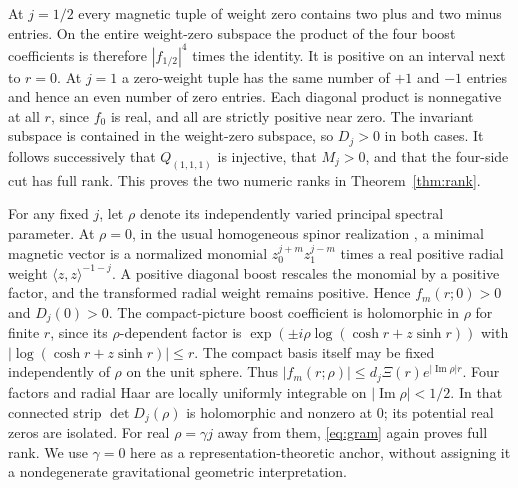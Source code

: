 \documentclass[11pt]{article}
\theoremstyle{remark}
\begin{document}
At \(j=1/2\) every magnetic tuple of weight zero contains two plus and two minus entries. On the entire weight-zero subspace the product of the four boost coefficients is therefore \(|f_{1/2}|^4\) times the identity. It is positive on an interval next to \(r=0\). At \(j=1\) a zero-weight tuple has the same number of \(+1\) and \(-1\) entries and hence an even number of zero entries. Each diagonal product is nonnegative at all \(r\), since \(f_0\) is real, and all are strictly positive near zero. The invariant subspace is contained in the weight-zero subspace, so \(D_j>0\) in both cases. It follows successively that \(Q_{(1,1,1)}\) is injective, that \(M_j>0\), and that the four-side cut has full rank. This proves the two numeric ranks in Theorem~\ref{thm:rank}.

For any fixed \(j\), let \(\rho\) denote its independently varied principal spectral parameter. At \(\rho=0\), in the usual homogeneous spinor realization \cite[Eqs.~(12)--(13)]{Barrett}, a minimal magnetic vector is a normalized monomial \(z_0^{j+m}z_1^{j-m}\) times a real positive radial weight \(\langle z,z\rangle^{-1-j}\). A positive diagonal boost rescales the monomial by a positive factor, and the transformed radial weight remains positive. Hence \(f_m(r;0)>0\) and \(D_j(0)>0\). The compact-picture boost coefficient is holomorphic in \(\rho\) for finite \(r\), since its \(\rho\)-dependent factor is \(\exp(\pm i\rho\log(\cosh r+z\sinh r))\) with \(|\log(\cosh r+z\sinh r)|\le r\). The compact basis itself may be fixed independently of \(\rho\) on the unit sphere. Thus \(|f_m(r;\rho)|\le d_j\Xi(r)e^{|\operatorname{Im}\rho|r}\). Four factors and radial Haar are locally uniformly integrable on \(|\operatorname{Im}\rho|<1/2\). In that connected strip \(\det D_j(\rho)\) is holomorphic and nonzero at 0; its potential real zeros are isolated. For real \(\rho=\gamma j\) away from them, \eqref{eq:gram} again proves full rank. We use \(\gamma=0\) here as a representation-theoretic anchor, without assigning it a nondegenerate gravitational geometric interpretation.
\end{document}
